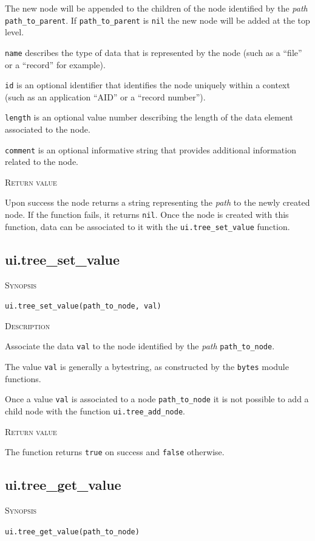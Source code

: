 \documentclass[11pt]{report}
\newcommand{\mansection}[1]{\vspace{0.5em}\par\noindent\textsc{#1}\vspace{0.5em}\par}
\newcommand{\syn}[1]{\texttt{#1}}
\begin{document}
  The new node will be appended to the children of the node identified by the 
  \emph{path} \syn{path\_to\_parent}.
  If \syn{path\_to\_parent} is \syn{nil} the new node will be added at 
  the top level.

  \syn{name} describes the type of data that is represented by the node 
  (such as a ``file'' or a ``record'' for example). 

  \syn{id} is an optional identifier that identifies the node uniquely within 
  a context (such as an application ``AID'' or a ``record number'').

  \syn{length} is an optional value number describing the length of the 
  data element associated to the node.

  \syn{comment} is an optional informative string that provides additional 
  information related to the node.
  
\mansection{Return value}
  Upon success the node returns a string representing the \emph{path} to the 
  newly created node. 
  If the function fails, it returns \syn{nil}.
  Once the node is created with this function, data can be associated to it with the \syn{ui.tree\_set\_value} function.


\subsection{ui.tree\_set\_value}

\mansection{Synopsis}
\syn{ui.tree\_set\_value(path\_to\_node, val)}

\mansection{Description}
  Associate the data \syn{val} to the node identified by the \emph{path} 
  \syn{path\_to\_node}.

  The value \syn{val} is generally a bytestring, 
  as constructed by the \syn{bytes} module functions.

  Once a value \syn{val} is associated to a node \syn{path\_to\_node} 
  it is not possible to add a child node with the function \syn{ui.tree\_add\_node}.
	  
\mansection{Return value}
  The function returns \syn{true} on success and \syn{false} otherwise.


\subsection{ui.tree\_get\_value}

\mansection{Synopsis}
\syn{ui.tree\_get\_value(path\_to\_node)}
\end{document}
